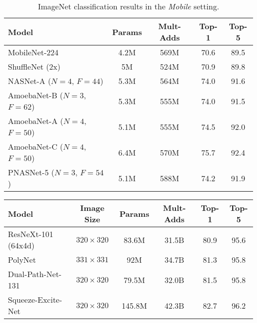 \documentclass[runningheads]{llncs}
\begin{document}
\begin{table}[t]
\begin{center}
    \begin{tabular}{lcccc}
    \toprule
         Model &  Params & Mult-Adds & Top-1 & Top-5 \\
        \midrule
        MobileNet-224 \cite{DBLP:journals/corr/HowardZCKWWAA17} & 4.2M & 569M & 70.6 & 89.5 \\
        ShuffleNet (2x) \cite{DBLP:journals/corr/ZhangZLS17} & 5M & 524M & 70.9 & 89.8 \\
        \midrule
        NASNet-A ($N=4$, $F=44$)
        \cite{DBLP:journals/corr/ZophVSL17} & 5.3M & 564M & 74.0 & 91.6 \\
        AmoebaNet-B ($N=3$, $F=62$) \cite{DBLP:journals/corr/abs-1802-01548} & 5.3M & 555M & 74.0 & 91.5 \\
        AmoebaNet-A ($N=4$, $F=50$) \cite{DBLP:journals/corr/abs-1802-01548} & 5.1M & 555M & 74.5 & 92.0 \\
        AmoebaNet-C ($N=4$, $F=50$) \cite{DBLP:journals/corr/abs-1802-01548} & 6.4M & 570M & 75.7 & 92.4 \\
        \midrule
        PNASNet-5 ($N=3$, $F=54$) & 5.1M & 588M & 74.2 & 91.9 \\
    \bottomrule
    \end{tabular}
\end{center}
\caption{ImageNet classification results in the \textit{Mobile} setting.
}
\label{tab:imagenet-mobile}
\end{table}\begin{table}[t]
\begin{center}
    \begin{tabular}{lccccc}
    \toprule
        Model & Image Size & Params & Mult-Adds & Top-1 & Top-5 \\
        \midrule
        ResNeXt-101 (64x4d) \cite{DBLP:journals/corr/XieGDTH16} & $320 \times 320$ & 83.6M & 31.5B & 80.9 & 95.6\\
        PolyNet \cite{DBLP:journals/corr/ZhangLLL16} & $331 \times 331$ & 92M & 34.7B & 81.3 & 95.8\\
        Dual-Path-Net-131 \cite{DBLP:journals/corr/ChenLXJYF17} & $320 \times 320$ & 79.5M & 32.0B & 81.5 & 95.8\\
        Squeeze-Excite-Net \cite{DBLP:journals/corr/abs-1709-01507} & $320 \times 320$ & 145.8M & 42.3B & 82.7 & 96.2\\

\end{tabular}
\end{center}
\end{table}
\end{document}

